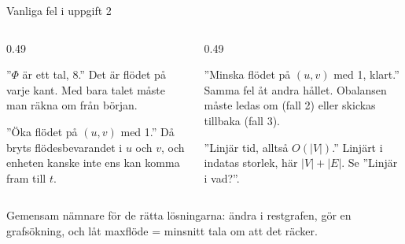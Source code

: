 \begin{frame}{Vanliga fel i uppgift 2}
\begin{columns}[T]
\begin{column}{0.49\textwidth}
\begin{missbox}[fontupper=\footnotesize]
”$\Phi$ är ett tal, 8.” Det är flödet på varje kant. Med bara talet måste man räkna om från början.
\end{missbox}
\begin{missbox}[fontupper=\footnotesize]
”Öka flödet på $(u,v)$ med 1.” Då bryts flödesbevarandet i $u$ och $v$, och enheten kanske inte
ens kan komma fram till $t$.
\end{missbox}
\end{column}
\begin{column}{0.49\textwidth}
\begin{missbox}[fontupper=\footnotesize]
”Minska flödet på $(u,v)$ med 1, klart.” Samma fel åt andra hållet. Obalansen måste ledas om
(fall 2) eller skickas tillbaka (fall 3).
\end{missbox}
\begin{missbox}[fontupper=\footnotesize]
”Linjär tid, alltså $O(|V|)$.” Linjärt i indatas storlek, här $|V|+|E|$. Se ”Linjär i vad?”.
\end{missbox}
\end{column}
\end{columns}
\vfill
\begin{ahabox}[fontupper=\footnotesize]
Gemensam nämnare för de rätta lösningarna: ändra i restgrafen, gör en grafsökning, och låt
maxflöde = minsnitt tala om att det räcker.
\end{ahabox}
\end{frame}
